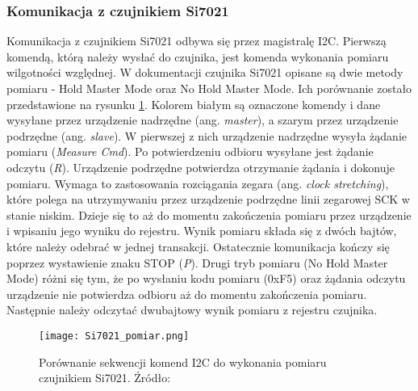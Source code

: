 \documentclass[a4paper,11pt,twoside]{article}
\begin{document}
\subsubsection{Komunikacja z czujnikiem Si7021}
Komunikacja z czujnikiem Si7021 odbywa się przez magistralę I2C. Pierwszą komendą, którą należy wysłać do czujnika, jest komenda wykonania pomiaru wilgotności względnej. W dokumentacji czujnika Si7021 opisane są dwie metody pomiaru - Hold Master Mode oraz No Hold Master Mode. Ich porównanie zostało przedstawione na rysunku \ref{fig: metody_pomiaru}. Kolorem białym są oznaczone komendy i dane wysyłane przez urządzenie nadrzędne (ang. \textit{master}), a szarym przez urządzenie podrzędne (ang. \textit{slave}). W pierwszej z nich urządzenie nadrzędne wysyła żądanie pomiaru (\textit{Measure Cmd}). Po potwierdzeniu odbioru wysyłane jest żądanie odczytu (\textit{R}). Urządzenie podrzędne potwierdza otrzymanie żądania i dokonuje pomiaru. Wymaga to zastosowania rozciągania zegara (ang. \textit{clock stretching}), które polega na utrzymywaniu przez urządzenie podrzędne linii zegarowej SCK w stanie niskim. Dzieje się to aż do momentu zakończenia pomiaru przez urządzenie i wpisaniu jego wyniku do rejestru. Wynik pomiaru składa się z dwóch bajtów, które należy odebrać w jednej transakcji. Ostatecznie komunikacja kończy się poprzez wystawienie znaku STOP (\textit{P}). Drugi tryb pomiaru (No Hold Master Mode) różni się tym, że po wysłaniu kodu pomiaru (0xF5) oraz żądania odczytu urządzenie nie potwierdza odbioru aż do momentu zakończenia pomiaru. Następnie należy odczytać dwubajtowy wynik pomiaru z rejestru czujnika.

\begin{figure}[H]
\begin{center}
\texttt{[image: Si7021\_pomiar.png]}
\caption{Porównanie sekwencji komend I2C do wykonania pomiaru czujnikiem Si7021. Źródło: \cite{czujnik_temp}}
\label{fig: metody_pomiaru}
\end{center}
\end{figure}
\end{document}
